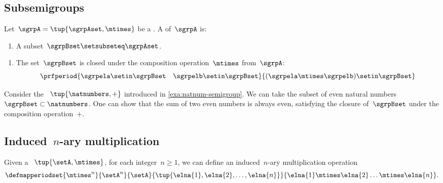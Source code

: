 \subsection{Subsemigroups}


\begin{definition}[Subsemigroup]\label{def:subsemigroup}
    Let~$\sgrpA = \tup{\sgrpAset, \mtimes}$ be a .
    A  of~$\sgrpA$ is:

    \constit

    \begin{enumerate}
        \item A subset~$\sgrpBset \setsubseteq \sgrpAset$.
    \end{enumerate}

    \condit

    \begin{enumerate}
        \item The set~$\sgrpBset$ is closed under the composition operation~$\mtimes$ from~$\sgrpA$:
              \begin{equation}\label{eq:subsemigroup-closure}
                  \prfperiod{
                      \sgrpela \setin \sgrpBset \quad \sgrpelb \setin \sgrpBset
                  }{
                      (\sgrpela \mtimes \sgrpelb) \setin \sgrpBset
                  }
              \end{equation}
    \end{enumerate}
\end{definition}

\begin{example}
    \label{exa:evennum-subsemigroup}
    Consider the ~$\tup{\natnumbers,+}$ introduced in \cref{exa:natnum-semigroup}.
    We can take the subset of even natural numbers~$\sgrpBset \subset \natnumbers$.
    One can show that the sum of two even numbers is always even, satisfying the closure of~$\sgrpBset$ under the composition operation~$+$.
\end{example}

\subsection{Induced~$n$-ary multiplication}
Given a ~$\tup{\setA, \mtimes}$, for each integer~$n\geq1$, we can define an induced~$n$-ary multiplication operation
%
\begin{equation}
    \defmapperiodset{\mtimes^n}{\setA^n}{\setA}{\tup{\elna{1}, \elna{2}, \ldots, \elna{n}}}{ \elna{1} \mtimes \elna{2} \ldots \mtimes \elna{n}}.
\end{equation}

